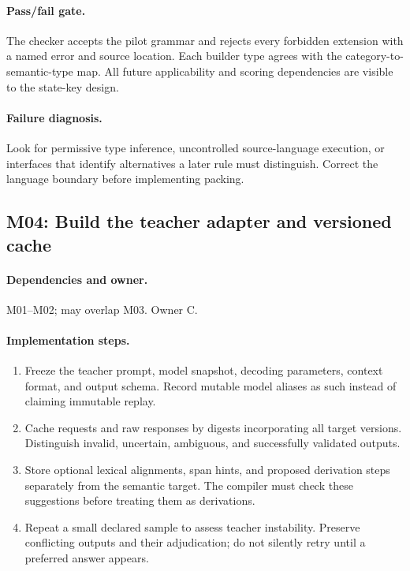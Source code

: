 \documentclass[11pt,a4paper]{article}
\begin{document}
\paragraph{Pass/fail gate.} The checker accepts the pilot grammar and rejects every forbidden extension with a named error and source location. Each builder type agrees with the category-to-semantic-type map. All future applicability and scoring dependencies are visible to the state-key design.

\paragraph{Failure diagnosis.} Look for permissive type inference, uncontrolled source-language execution, or interfaces that identify alternatives a later rule must distinguish. Correct the language boundary before implementing packing.

\subsection{M04: Build the teacher adapter and versioned cache}

\paragraph{Dependencies and owner.} M01--M02; may overlap M03. Owner C.

\paragraph{Implementation steps.}
\begin{enumerate}
\item Freeze the teacher prompt, model snapshot, decoding parameters, context format, and output schema. Record mutable model aliases as such instead of claiming immutable replay.
\item Cache requests and raw responses by digests incorporating all target versions. Distinguish invalid, uncertain, ambiguous, and successfully validated outputs.
\item Store optional lexical alignments, span hints, and proposed derivation steps separately from the semantic target. The compiler must check these suggestions before treating them as derivations.
\item Repeat a small declared sample to assess teacher instability. Preserve conflicting outputs and their adjudication; do not silently retry until a preferred answer appears.
\end{enumerate}
\end{document}
